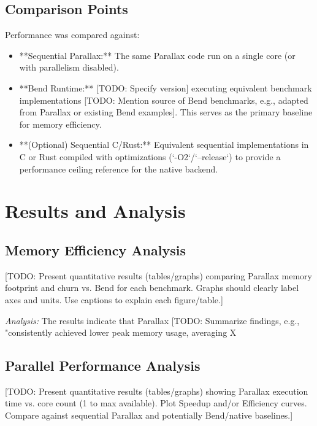 \subsection{Comparison Points} %
Performance was compared against:
\begin{itemize}
    \item **Sequential Parallax:** The same Parallax code run on a single core (or with parallelism disabled).
    \item **Bend Runtime:** [TODO: Specify version] executing equivalent benchmark implementations [TODO: Mention source of Bend benchmarks, e.g., adapted from Parallax or existing Bend examples]. This serves as the primary baseline for memory efficiency.
    \item **(Optional) Sequential C/Rust:** Equivalent sequential implementations in C or Rust compiled with optimizations (`-O2`/`--release`) to provide a performance ceiling reference for the native backend.
\end{itemize}

\section{Results and Analysis} %

\subsection{Memory Efficiency Analysis} %
[TODO: Present quantitative results (tables/graphs) comparing Parallax memory footprint and churn vs. Bend for each benchmark. Graphs should clearly label axes and units. Use captions to explain each figure/table.]

\textit{Analysis:} The results indicate that Parallax [TODO: Summarize findings, e.g., "consistently achieved lower peak memory usage, averaging X%

\subsection{Parallel Performance Analysis} %
[TODO: Present quantitative results (tables/graphs) showing Parallax execution time vs. core count (1 to max available). Plot Speedup and/or Efficiency curves. Compare against sequential Parallax and potentially Bend/native baselines.]

